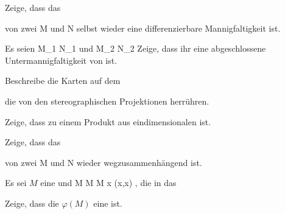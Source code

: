 \setcounter{section}{11}


{}
{

Zeige, dass das

 von zwei
\mathkor {} {M} {und} {N} {}
selbst wieder eine differenzierbare Mannigfaltigkeit ist.

}
{} {}

{}
{

Es seien
\mathkor {} {M_1 \subseteq N_1} {und} {M_2 \subseteq N_2} {}
 Zeige, dass ihr
 eine abgeschlossene Untermannigfaltigkeit von
 ist.

}
{} {}

{}
{

Beschreibe die Karten auf dem

 die von den stereographischen Projektionen herrühren.

}
{} {}

{}
{

Zeige, dass
zu einem Produkt aus eindimensionalen
ist.

}
{} {}

{}
{

Zeige, dass das

 von zwei
 
\mathkor {} {M} {und} {N} {}
wieder wegzusammenhängend ist.

}
{} {}

{}
{

Es sei $M$ eine
und
\maabbeledisp {\varphi} { M } { M \times M
} { x } {(x,x)
} {,}
die
in das

 Zeige, dass die
$\varphi(M)$ eine
ist.

}
{} {}

